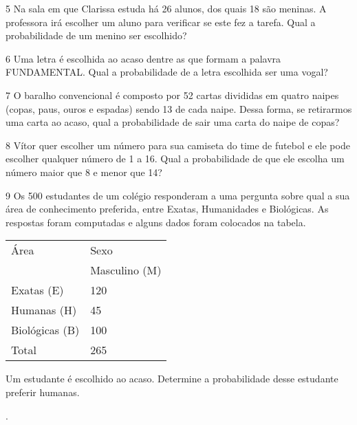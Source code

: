\num{5} Na sala em que Clarissa estuda há 26 alunos, dos quais 18 são
meninas. A professora irá escolher um aluno para verificar se este fez a
tarefa. Qual a probabilidade de um menino ser escolhido?



\num{6} Uma letra é escolhida ao acaso dentre as que formam a palavra
FUNDAMENTAL. Qual a probabilidade de a letra escolhida ser uma vogal?



\num{7} O baralho convencional é composto por 52 cartas divididas em quatro
naipes (copas, paus, ouros e espadas) sendo 13 de cada naipe. Dessa
forma, se retirarmos uma carta ao acaso, qual a probabilidade de sair
uma carta do naipe de copas?



\num{8} Vítor quer escolher um número para sua camiseta do time de futebol
e ele pode escolher qualquer número de 1 a 16. Qual a probabilidade de
que ele escolha um número maior que 8 e menor que 14?



\num{9} Os 500 estudantes de um colégio responderam a uma pergunta sobre
qual a sua área de conhecimento preferida, entre Exatas, Humanidades e
Biológicas. As respostas foram computadas e alguns dados foram colocados
na tabela.

\begin{longtable}[]{@{}ll@{}}
\toprule
Área & Sexo\tabularnewline
& Masculino (M)\tabularnewline
Exatas (E) & 120\tabularnewline
Humanas (H) & 45\tabularnewline
Biológicas (B) & 100\tabularnewline
Total & 265\tabularnewline
\bottomrule
\end{longtable}

Um estudante é escolhido ao acaso. Determine a probabilidade desse
estudante preferir humanas.

.


